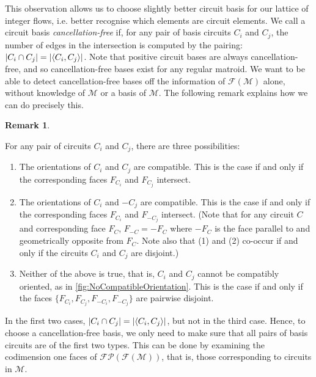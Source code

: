 \documentclass[12pt]{report}
\theoremstyle{definition}
\newtheorem{remark}[theorem]{Remark}
\DeclarePairedDelimiter\abs{\lvert}{\rvert}
\DeclarePairedDelimiter\iprod{\langle}{\rangle}
\def\calF{\mathcal F}
\def\calM{\mathcal M}
\def\calP{\mathcal P}
\theoremstyle{upright}
\begin{document}
This observation allows us to choose slightly better circuit basis for our lattice of integer flows, i.e. better recognise which elements are circuit elements.
We call a circuit basis \textit{cancellation-free} if, for any pair of basis circuits $C_i$ and $C_j$, the number of edges in the intersection is computed by the pairing: $\abs*{C_i\cap C_j}=\abs*{\iprod*{C_i, C_j}}$.
Note that positive circuit bases are always cancellation-free, and so cancellation-free bases exist for any regular matroid.
We want to be able to detect cancellation-free bases off the information of $\calF(\calM)$ alone, without knowledge of $\calM$ or a basis of $\calM$.
The following remark explains how we can do precisely this.

\begin{remark}\label{rem:CancellationFree}

    For any pair of circuits $C_i$ and $C_j$, there are three possibilities:

    \begin{enumerate}
        \item The orientations of $C_i$ and $C_j$ are compatible.
        This is the case if and only if the corresponding faces $F_{C_i}$ and $F_{C_j}$ intersect.
        \item The orientations of $C_i$ and $-C_j$ are compatible.
        This is the case if and only if the corresponding faces $F_{C_i}$ and $F_{-C_j}$ intersect.
        (Note that for any circuit $C$ and corresponding face $F_C$, $F_{-C}=-F_C$ where $-F_C$ is the face parallel to and geometrically opposite from $F_C$.
        Note also that (1) and (2) co-occur if and only if the circuits $C_i$ and $C_j$ are disjoint.)
        \item Neither of the above is true, that is, $C_i$ and $C_j$ cannot be compatibly oriented, as in \cref{fig:NoCompatibleOrientation}.
        This is the case if and only if the faces $\{F_{C_i}, F_{C_j}, F_{-C_i}, F_{-C_j}\}$ are pairwise disjoint.
    \end{enumerate}
    
\end{remark}

In the first two cases, $\abs*{C_i\cap C_j}=\abs*{\iprod*{C_i, C_j}}$, but not in the third case.
Hence, to choose a cancellation-free basis, we only need to make sure that all pairs of basis circuits are of the first two types.
This can be done by examining the codimension one faces of $\calF\calP(\calF(\calM))$, that is, those corresponding to circuits in $\calM$.
\end{document}
